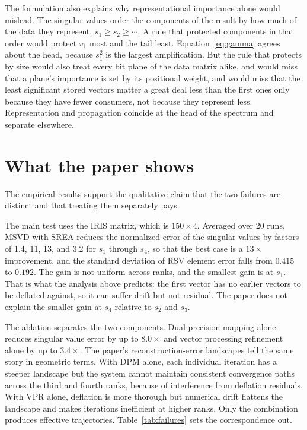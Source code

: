 \documentclass[11pt]{article}
\theoremstyle{definition}
\theoremstyle{remark}
\begin{document}
The formulation also explains why representational importance alone would mislead. The singular values order the components of the result by how much of the data they represent, $s_1\ge s_2\ge\cdots$. A rule that protected components in that order would protect $v_1$ most and the tail least. Equation~\eqref{eq:gamma} agrees about the head, because $s_1^2$ is the largest amplification. But the rule that protects by size would also treat every bit plane of the data matrix alike, and would miss that a plane's importance is set by its positional weight, and would miss that the least significant stored vectors matter a great deal less than the first ones only because they have fewer consumers, not because they represent less. Representation and propagation coincide at the head of the spectrum and separate elsewhere.

\section{What the paper shows}

The empirical results support the qualitative claim that the two failures are distinct and that treating them separately pays.

The main test uses the IRIS matrix, which is $150\times4$. Averaged over 20 runs, MSVD with SREA reduces the normalized error of the singular values by factors of 1.4, 11, 13, and 3.2 for $s_1$ through $s_4$, so that the best case is a $13\times$ improvement, and the standard deviation of RSV element error falls from $0.415$ to $0.192$. The gain is not uniform across ranks, and the smallest gain is at $s_1$. That is what the analysis above predicts: the first vector has no earlier vectors to be deflated against, so it can suffer drift but not residual. The paper does not explain the smaller gain at $s_4$ relative to $s_2$ and $s_3$.

The ablation separates the two components. Dual-precision mapping alone reduces singular value error by up to $8.0\times$ and vector processing refinement alone by up to $3.4\times$. The paper's reconstruction-error landscapes tell the same story in geometric terms. With DPM alone, each individual iteration has a steeper landscape but the system cannot maintain consistent convergence paths across the third and fourth ranks, because of interference from deflation residuals. With VPR alone, deflation is more thorough but numerical drift flattens the landscape and makes iterations inefficient at higher ranks. Only the combination produces effective trajectories. Table~\ref{tab:failures} sets the correspondence out.
\end{document}
